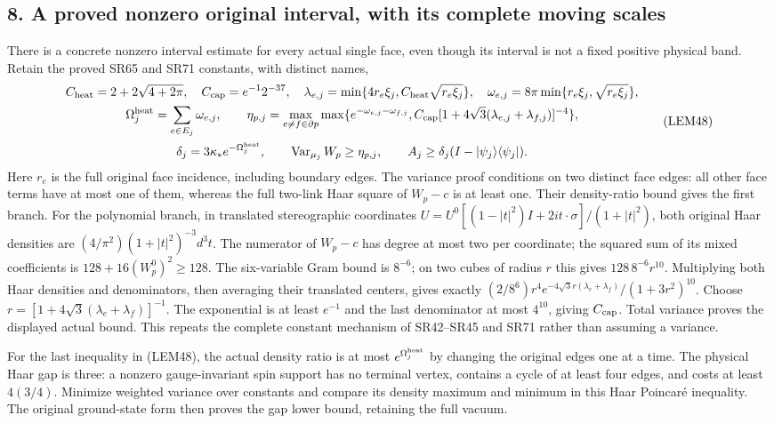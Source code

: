 \documentclass[11pt]{article}
\begin{document}
\subsection*{8. A proved nonzero original interval, with its complete moving scales}

There is a concrete nonzero interval estimate for every actual single face, even though its interval is not a fixed positive physical band. Retain the proved SR65 and SR71 constants, with distinct names,
\[
\begin{gathered}
C_{\rm heat}=2+2\sqrt{4+2\pi},\quad C_{\rm cap}=e^{-1}2^{-37},\quad
\lambda_{e,j}=\min\{4r_e\xi_j,C_{\rm heat}\sqrt{r_e\xi_j}\},\quad
\omega_{e,j}=8\pi\min\{r_e\xi_j,\sqrt{r_e\xi_j}\},\\
\Omega_j^{\rm heat}=\sum_{e\in E_j}\omega_{e,j},\qquad
\eta_{p,j}=\max_{e\ne f\in\partial p}
 \max\{e^{-\omega_{e,j}-\omega_{f,j}},
 C_{\rm cap}[1+4\sqrt3(\lambda_{e,j}+\lambda_{f,j})]^{-4}\},\\
\delta_j=3\kappa_*e^{-\Omega_j^{\rm heat}},\qquad
\operatorname{Var}_{\mu_j}W_p\ge\eta_{p,j},\qquad
A_j\ge\delta_j(I-|\psi_j\rangle\langle\psi_j|).
\end{gathered}\tag{LEM48}
\]
Here \(r_e\) is the full original face incidence, including boundary edges. The variance proof conditions on two distinct face edges: all other face terms have at most one of them, whereas the full two-link Haar square of \(W_p-c\) is at least one. Their density-ratio bound gives the first branch. For the polynomial branch, in translated stereographic coordinates \(U=U^0[(1-|t|^2)I+2i t\cdot\sigma]/(1+|t|^2)\), both original Haar densities are \((4/\pi^2)(1+|t|^2)^{-3}d^3t\). The numerator of \(W_p-c\) has degree at most two per coordinate; the squared sum of its mixed coefficients is \(128+16(W_p^0)^2\ge128\). The six-variable Gram bound is \(8^{-6}\); on two cubes of radius \(r\) this gives \(128\,8^{-6}r^{10}\). Multiplying both Haar densities and denominators, then averaging their translated centers, gives exactly
\((2/8^6)r^4e^{-4\sqrt3r(\lambda_e+\lambda_f)}/(1+3r^2)^{10}\).
Choose \(r=[1+4\sqrt3(\lambda_e+\lambda_f)]^{-1}\). The exponential is at least \(e^{-1}\) and the last denominator at most \(4^{10}\), giving \(C_{\rm cap}\). Total variance proves the displayed actual bound. This repeats the complete constant mechanism of SR42–SR45 and SR71 rather than assuming a variance.

For the last inequality in (LEM48), the actual density ratio is at most \(e^{\Omega_j^{\rm heat}}\) by changing the original edges one at a time. The physical Haar gap is three: a nonzero gauge-invariant spin support has no terminal vertex, contains a cycle of at least four edges, and costs at least \(4(3/4)\). Minimize weighted variance over constants and compare its density maximum and minimum in this Haar Poincaré inequality. The original ground-state form then proves the gap lower bound, retaining the full vacuum.
\end{document}
